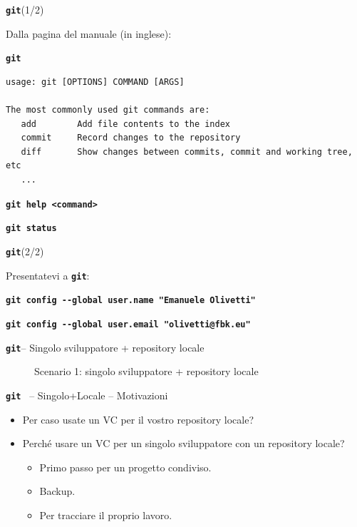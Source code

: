\documentclass{beamer}
\newcommand{\git}{\texttt{\textbf{git}}\xspace}
\begin{document}
\begin{frame}[containsverbatim]{\centerline{\git (1/2)}}
  \begin{center}
  Dalla pagina del manuale (in inglese):
  \item \texttt{\textbf{git}}
  \end{center}
\begin{verbatim}
usage: git [OPTIONS] COMMAND [ARGS]

The most commonly used git commands are:
   add        Add file contents to the index
   commit     Record changes to the repository
   diff       Show changes between commits, commit and working tree, etc
   ...
\end{verbatim}
  \begin{center}
    \texttt{\textbf{git help <command>}}
  \end{center}
  \begin{center}
    \texttt{\textbf{git status}}
  \end{center}
\end{frame}

\begin{frame}{\centerline{\git (2/2)}}
  Presentatevi a \git:
  \begin{center}
    \small
    \texttt{\textbf{git config -{}-global user.name "Emanuele Olivetti"}}
  \end{center}
  \vspace{0.2cm}
  \begin{center}
    \small
    \texttt{\textbf{git config -{}-global user.email "olivetti@fbk.eu"}}
  \end{center}
\end{frame}

\begin{frame}{\centerline{\git -- Singolo sviluppatore + repository locale}}
  \begin{figure}
    \centering
    Scenario 1: singolo sviluppatore + repository locale
  \end{figure}
\end{frame}

\begin{frame}{\centerline{ \git ~ -- Singolo+Locale -- Motivazioni}}
  \begin{itemize}\setlength{\itemsep}{+3mm}
  \item Per caso usate un VC per il vostro repository locale?
  \item Perch\'{e} usare un VC per un singolo sviluppatore con un repository locale?
    \begin{itemize}\setlength{\itemsep}{+2mm}
    \item Primo passo per un progetto condiviso.
    \item Backup.
    \item Per tracciare il proprio lavoro.
    \end{itemize}
  \end{itemize}
\end{frame}
\end{document}

